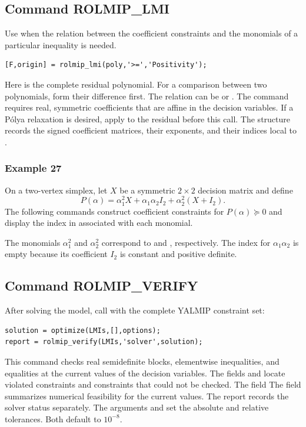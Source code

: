 \documentclass[english,11pt]{article}
\theoremstyle{break} \theorembodyfont{\small\rm}
\begin{document}
\subsection*{Command ROLMIP\_LMI}
Use  when the relation between the coefficient
constraints and the monomials of a particular inequality is needed.
\begin{lstlisting}
[F,origin] = rolmip_lmi(poly,'>=','Positivity');
\end{lstlisting}
Here  is the complete residual polynomial. For a comparison
between two polynomials, form their difference first. The relation can be
 or . The command requires real, symmetric
coefficients that are affine in the decision variables. If a P\'{o}lya
relaxation is desired, apply  to the residual before this call.
The structure  records the signed coefficient matrices,
their exponents, and their indices local to .

\subsubsection*{Example 27}
On a two-vertex simplex, let $X$ be a symmetric $2\times 2$ decision
matrix and define
\[
  P(\alpha)=\alpha_1^2 X+\alpha_1\alpha_2 I_2+\alpha_2^2(X+I_2).
\]
The following commands construct coefficient constraints for
$P(\alpha)\succeq 0$ and display the index in  associated with
each monomial.



The monomials $\alpha_1^2$ and $\alpha_2^2$ correspond to
 and , respectively. The index for
$\alpha_1\alpha_2$ is empty because its coefficient $I_2$ is
constant and positive definite.

\subsection*{Command ROLMIP\_VERIFY}
After solving the model, call  with the complete
YALMIP constraint set:
\begin{lstlisting}
solution = optimize(LMIs,[],options);
report = rolmip_verify(LMIs,'solver',solution);
\end{lstlisting}
This command checks real semidefinite blocks, elementwise inequalities,
and equalities at the current values of the decision variables. The fields
 and  locate violated
constraints and constraints that could not be checked. The field
The field  summarizes numerical feasibility
for the current values. The report records the solver status separately.
The arguments  and  set the absolute
and relative tolerances. Both default to $10^{-8}$.
\end{document}
